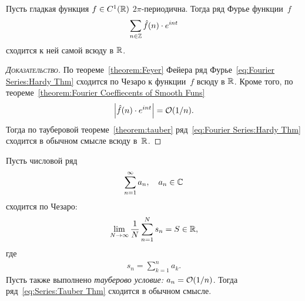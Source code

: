 \documentclass[../complex-analysis.tex]{subfiles}
\begin{document}
 \begin{thm}[Харди]
  Пусть гладкая функция $ f \in C^{1}(\mathbb{R}) $ $ 2\pi $-периодична. Тогда ряд Фурье функции~$ f $ 
  \begin{align}
   \label{eq:Fourier Series:Hardy Thm}
   \sum_{n \in \mathbb{Z}} \hat f(n) \cdot  e^{int}
  \end{align} сходится к ней самой всюду в $ \mathbb{R} $.
 \end{thm}
 \begin{proof}[\normalfont\textsc{Доказательство}]
  По теореме~\ref{theorem:Feyer} Фейера ряд Фурье~\eqref{eq:Fourier Series:Hardy Thm} сходится по Чезаро к функции~$ f $ всюду в $ \mathbb{R} $. Кроме того, по теореме~\ref{theorem:Fourier Coeffiecents of Smooth Funs}
  \begin{align*}
   \left| \hat f(n) \cdot e^{int} \right| = \mathcal{O}(1 / n).
  \end{align*} Тогда по тауберовой теореме~\ref{theorem:tauber} ряд~\eqref{eq:Fourier Series:Hardy Thm} сходится в обычном смысле всюду в~$ \mathbb{R} $.
 \end{proof}

 \begin{thm}
  \label{theorem:tauber}
  Пусть числовой ряд
  \begin{align}
   \label{eq:Series:Tauber Thm}
   \sum_{n=1}^{\infty} a_n, \quad a_n \in \mathbb{C}
  \end{align} сходится по Чезаро:
  \begin{align*}
   \lim_{N \to \infty} \frac{1}{N} \sum_{n=1}^{N} s_n = S \in \mathbb{R},
  \end{align*} где
  \begin{align*}
   s_n = \sum_{k=1}^{n} a_k.
  \end{align*} Пусть также выполнено \emph{тауберово условие:} $ a_n = \mathcal{O}(1 / n) $. Тогда ряд~\eqref{eq:Series:Tauber Thm} сходится в обычном смысле.
 \end{thm}
\end{document}
